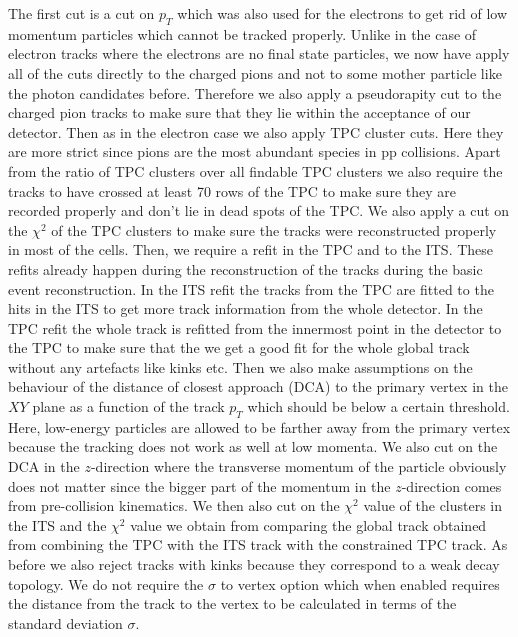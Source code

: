 The first cut is a cut on $p_T$ which was also used for the electrons to get rid of low momentum particles which cannot be tracked properly. Unlike in the case of electron tracks where the electrons are no final state particles, we now have apply all of the cuts directly to the charged pions and not to some mother particle like the photon candidates before. Therefore we also apply a pseudorapity cut to the charged pion tracks to make sure that they lie within the acceptance of our detector. Then as in the electron case we also apply TPC cluster cuts. Here they are more strict since pions are the most abundant species in pp collisions. Apart from the ratio of TPC clusters over all findable TPC clusters we also require the tracks to have crossed at least 70 rows of the TPC to make sure they are recorded properly and don't lie in dead spots of the TPC. We also apply a cut on the $\chi^2$ of the TPC clusters to make sure the tracks were reconstructed properly in most of the cells. Then, we require a refit in the TPC and to the ITS. These refits already happen during the reconstruction of the tracks during the basic event reconstruction. In the ITS refit the tracks from the TPC are fitted to the hits in the ITS to get more track information from the whole detector. In the TPC refit the whole track is refitted from the innermost point in the detector to the TPC to make sure that the we get a good fit for the whole global track without any artefacts like kinks etc. Then we also make assumptions on the behaviour of the distance of closest approach (DCA) to the primary vertex in the $XY$ plane as a function of the track $p_T$ which should be below a certain threshold. Here, low-energy particles are allowed to be farther away from the primary vertex because the tracking does not work as well at low momenta. We also cut on the DCA in the $z$-direction where the transverse momentum of the particle obviously does not matter since the bigger part of the momentum in the $z$-direction comes from pre-collision kinematics. We then also cut on the $\chi^2$ value of the clusters in the ITS and the $\chi^2$ value we obtain from comparing the global track obtained from combining the TPC with the ITS track with the constrained TPC track. As before we also reject tracks with kinks because they correspond to a weak decay topology. We do not require the $\sigma$ to vertex option which when enabled requires the distance from the track to the vertex to be calculated in terms of the standard deviation $\sigma$. \\
